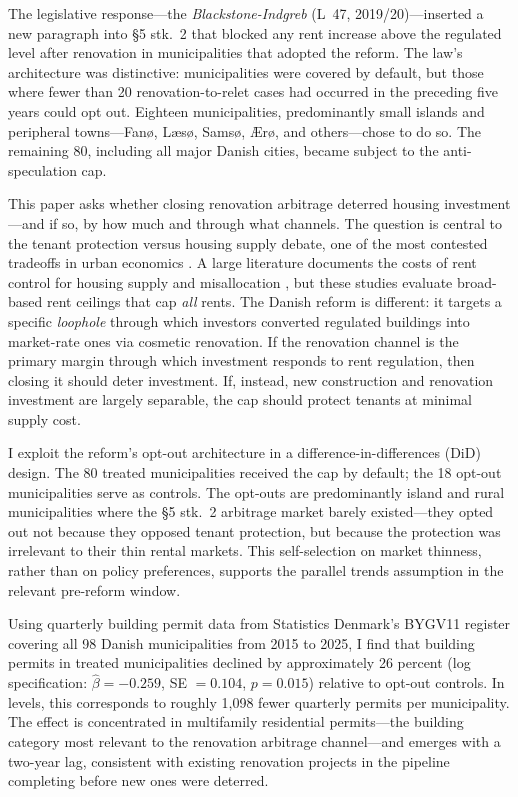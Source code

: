 \documentclass[12pt]{article}
\begin{document}
The legislative response---the \emph{Blackstone-Indgreb} (L~47, 2019/20)---inserted a new paragraph into \S5 stk.\ 2 that blocked any rent increase above the regulated level after renovation in municipalities that adopted the reform. The law's architecture was distinctive: municipalities were covered by default, but those where fewer than 20 renovation-to-relet cases had occurred in the preceding five years could opt out. Eighteen municipalities, predominantly small islands and peripheral towns---Fan{\o}, L{\ae}s{\o}, Sams{\o}, {\AE}r{\o}, and others---chose to do so. The remaining 80, including all major Danish cities, became subject to the anti-speculation cap.

This paper asks whether closing renovation arbitrage deterred housing investment---and if so, by how much and through what channels. The question is central to the tenant protection versus housing supply debate, one of the most contested tradeoffs in urban economics \citep{arnott1995,glaeser2003}. A large literature documents the costs of rent control for housing supply and misallocation \citep{diamond2019,autor2014,svensson2022}, but these studies evaluate broad-based rent ceilings that cap \emph{all} rents. The Danish reform is different: it targets a specific \emph{loophole} through which investors converted regulated buildings into market-rate ones via cosmetic renovation. If the renovation channel is the primary margin through which investment responds to rent regulation, then closing it should deter investment. If, instead, new construction and renovation investment are largely separable, the cap should protect tenants at minimal supply cost.

I exploit the reform's opt-out architecture in a difference-in-differences (DiD) design. The 80 treated municipalities received the cap by default; the 18 opt-out municipalities serve as controls. The opt-outs are predominantly island and rural municipalities where the \S5 stk.\ 2 arbitrage market barely existed---they opted out not because they opposed tenant protection, but because the protection was irrelevant to their thin rental markets. This self-selection on market thinness, rather than on policy preferences, supports the parallel trends assumption in the relevant pre-reform window.

Using quarterly building permit data from Statistics Denmark's BYGV11 register covering all 98 Danish municipalities from 2015 to 2025, I find that building permits in treated municipalities declined by approximately 26 percent (log specification: $\hat{\beta} = -0.259$, SE $= 0.104$, $p = 0.015$) relative to opt-out controls. In levels, this corresponds to roughly 1,098 fewer quarterly permits per municipality. The effect is concentrated in multifamily residential permits---the building category most relevant to the renovation arbitrage channel---and emerges with a two-year lag, consistent with existing renovation projects in the pipeline completing before new ones were deterred.
\end{document}
